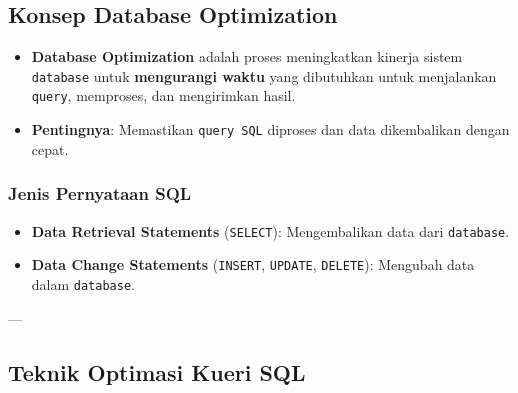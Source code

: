 \documentclass{article}
\begin{document}
\subsection{Konsep Database Optimization}
\begin{itemize}
    \item \textbf{Database Optimization} adalah proses meningkatkan kinerja sistem \texttt{database} untuk \textbf{mengurangi waktu} yang dibutuhkan untuk menjalankan \texttt{query}, memproses, dan mengirimkan hasil.
    \item \textbf{Pentingnya}: Memastikan \texttt{query SQL} diproses dan data dikembalikan dengan cepat.
\end{itemize}

\subsubsection{Jenis Pernyataan SQL}
\begin{itemize}
    \item \textbf{Data Retrieval Statements} (\texttt{SELECT}): Mengembalikan data dari \texttt{database}.
    \item \textbf{Data Change Statements} (\texttt{INSERT}, \texttt{UPDATE}, \texttt{DELETE}): Mengubah data dalam \texttt{database}.
\end{itemize}

---

\subsection{Teknik Optimasi Kueri SQL}
\end{document}
